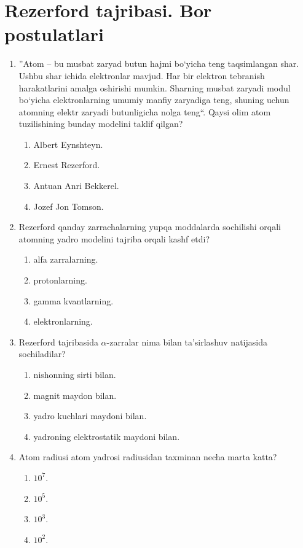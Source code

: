 \section{Rezerford tajribasi. Bor postulatlari}


\begin{enumerate}

\item ''Atom – bu musbat zaryad butun hajmi bo‘yicha teng taqsimlangan shar. Ushbu shar ichida elektronlar mavjud. Har bir elektron tebranish harakatlarini amalga oshirishi mumkin. Sharning musbat zaryadi modul bo‘yicha elektronlarning umumiy manfiy zaryadiga teng, shuning uchun atomning elektr zaryadi butunligicha nolga teng``. Qaysi olim atom tuzilishining bunday modelini taklif qilgan?
\begin{enumerate}[label=\Alph*)]
\item Albert Eynshteyn.
\item Ernest Rezerford.
\item Antuan Anri Bekkerel.
\item Jozef Jon Tomson.
\end{enumerate}

\item Rezerford qanday zarrachalarning yupqa moddalarda sochilishi orqali atomning yadro modelini tajriba orqali kashf etdi?
\begin{enumerate}[label=\Alph*)]
\item alfa zarralarning.
\item protonlarning.
\item gamma kvantlarning.
\item elektronlarning.
\end{enumerate}

\item Rezerford tajribasida $\alpha$-zarralar nima bilan ta’sirlashuv natijasida sochiladilar?
\begin{enumerate}[label=\Alph*)]
\item nishonning sirti bilan.
\item magnit maydon bilan.
\item yadro kuchlari maydoni bilan.
\item yadroning elektrostatik maydoni bilan.
\end{enumerate}

\item Atom radiusi atom yadrosi radiusidan taxminan necha marta katta?
\begin{enumerate}[label=\Alph*)]
\item $10^7$.
\item $10^5$.
\item $10^3$.
\item $10^2$.
\end{enumerate}


\end{enumerate}
